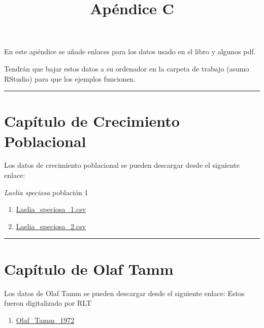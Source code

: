 \documentclass[
  12pt,
  letterpaper,
]{book}
\title{Apéndice C}
\author{}
\date{}
\providecommand{\tightlist}{%
  \setlength{\itemsep}{0pt}\setlength{\parskip}{0pt}}\usepackage{longtable,booktabs,array}
\renewcommand*\contentsname{Table of contents}
\newcommand\contentsname{Table of contents}
\begin{document}
\frontmatter
\maketitle

\renewcommand*\contentsname{Table of contents}
{
\hypersetup{linkcolor=}
\setcounter{tocdepth}{2}
\tableofcontents
}

\mainmatter
En este apéndice se añade enlaces para los datos usado en el libro y
algunos pdf.

Tendrán que bajar estos datos a su ordenador en la carpeta de trabajo
(asumo RStudio) para que los ejemplos funcionen.

\begin{center}\rule{0.5\linewidth}{0.5pt}\end{center}

\chapter{Capítulo de Crecimiento
Poblacional}\label{capuxedtulo-de-crecimiento-poblacional}

Los datos de crecimiento poblacional se pueden descargar desde el
siguiente enlace:

\emph{Laelia speciosa} población 1

\begin{enumerate}
\def\labelenumi{\arabic{enumi}.}
\tightlist
\item
  \href{data/laelia1.txt}{Laelia\_speciosa\_1.csv}
\item
  \href{data/laelia2.txt}{Laelia\_speciosa\_2.csv}
\end{enumerate}

\begin{center}\rule{0.5\linewidth}{0.5pt}\end{center}

\chapter{Capítulo de Olaf Tamm}\label{capuxedtulo-de-olaf-tamm}

Los datos de Olaf Tamm se pueden descargar desde el siguiente enlace:
Estos fueron digitalizado por RLT

\begin{enumerate}
\def\labelenumi{\arabic{enumi}.}
\tightlist
\item
  \href{data/Tamm_1972.xlsx}{Olaf\_Tamm\_1972}
\end{enumerate}
\end{document}
